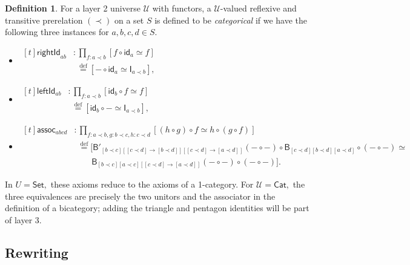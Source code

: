 \documentclass[a4paper]{article}
\theoremstyle{definition}
\newtheorem{definition}{Definition}[section]
\theoremstyle{remark}
\newcommand{\defn}{\emph}
\newcommand{\eqDef}{\overset{\text{def}}{=}}
\renewcommand{\equiv}{\simeq}
\newcommand{\U}{\mathcal{U}}
\newcommand{\V}{\mathcal{V}}
\newcommand{\nm}{\mathsf}
\newcommand{\universe}{\nm}
\newcommand{\Set}{\universe{Set}}
\newcommand{\Cat}{\universe{Cat}}
\newcommand{\id}{\nm{id}}
\newcommand{\combinator}{\nm}
\newcommand{\idFun}{\combinator{I}}
\newcommand{\compFun}{\combinator{B'}}
\newcommand{\revCompFun}{\combinator{B}}
\newcommand{\rightId}{\nm{rightId}}
\newcommand{\leftId}{\nm{leftId}}
\newcommand{\assoc}{\nm{assoc}}
\begin{document}
\begin{definition}
  For a layer 2 universe $\U$ with functors, a $\U$-valued reflexive and transitive prerelation
  $(\prec)$ on a set $S$ is defined to be \defn{categorical} if we have the following three
  instances for $a,b,c,d \in S.$
  \begin{itemize}
    \item $\begin{aligned}[t]
      \rightId_{ab} &: \prod_{f : a \prec b} [f \circ \id_a \equiv f]\\
                    &\ \ \eqDef [- \circ \id_a \equiv \idFun_{a{\prec}b}],
    \end{aligned}$
    \item $\begin{aligned}[t]
      \leftId_{ab} &: \prod_{f : a \prec b} [\id_b \circ f \equiv f]\\
                   &\ \ \eqDef [\id_b \circ - \equiv \idFun_{a{\prec}b}],
    \end{aligned}$
    \item $\begin{aligned}[t]
      \assoc_{abcd} &: \prod_{f : a \prec b, g : b \prec c, h : c \prec d} [(h \circ g) \circ f \equiv h \circ (g \circ f)]\\
                    &\ \ \eqDef [\compFun_{[b{\prec}c][[c{\prec}d]{\to}[b{\prec}d]][[c{\prec}d]{\to}[a{\prec}d]]}(- \circ -) \circ \revCompFun_{[c{\prec}d][b{\prec}d][a{\prec}d]} \circ (- \circ -) \equiv\\
                    &\ \ \quad\ \ \,\revCompFun_{[b{\prec}c][a{\prec}c][[c{\prec}d]{\to}[a{\prec}d]]}(- \circ -) \circ (- \circ -)].
    \end{aligned}$
  \end{itemize}
\end{definition}

In $U = \Set,$ these axioms reduce to the axioms of a 1-category. For $\U = \Cat,$ the three
equivalences are precisely the two unitors and the associator in the definition of a bicategory;
adding the triangle and pentagon identities will be part of layer 3.

\subsection{Rewriting}

\end{document}
